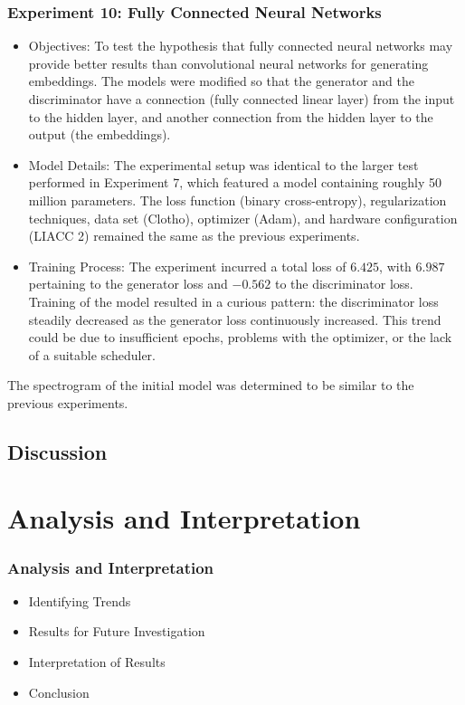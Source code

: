 \begin{frame}
    \frametitle{Experiment 10: Fully Connected Neural Networks}

    \begin{itemize}
        \item Objectives: To test the hypothesis that fully connected neural networks may provide better results than convolutional neural networks for generating embeddings. The models were modified so that the generator and the discriminator have a connection (fully connected linear layer) from the input to the hidden layer, and another connection from the hidden layer to the output (the embeddings).
        \item Model Details: The experimental setup was identical to the larger test performed in Experiment 7, which featured a model containing roughly 50 million parameters. The loss function (binary cross-entropy), regularization techniques, data set (Clotho), optimizer (Adam), and hardware configuration (LIACC 2) remained the same as the previous experiments.
        \item Training Process: The experiment incurred a total loss of $6.425$, with $6.987$ pertaining to the generator loss and $-0.562$ to the discriminator loss. Training of the model resulted in a curious pattern: the discriminator loss steadily decreased as the generator loss continuously increased. This trend could be due to insufficient epochs, problems with the optimizer, or the lack of a suitable scheduler.
    \end{itemize}

    The spectrogram of the initial model was determined to be similar to the previous experiments.
\end{frame}


\subsection{Discussion}

\section{Analysis and Interpretation} \label{sec:res-analysis}

\begin{frame}
    \frametitle{Analysis and Interpretation}
    
    \begin{itemize}
        \item Identifying Trends
        \item Results for Future Investigation
        \item Interpretation of Results
        \item Conclusion
    \end{itemize}
    
\end{frame}

